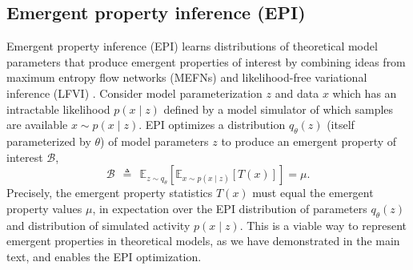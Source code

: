 \documentclass[11pt]{article}
\begin{document}
\subsection{Emergent property inference (EPI)}\label{methods_EPI}
Emergent property inference (EPI) learns distributions of theoretical model parameters that produce emergent properties of interest by combining ideas from maximum entropy flow networks (MEFNs) \cite{loaiza2017maximum} and likelihood-free variational inference (LFVI) \cite{tran2017hierarchical}.  
Consider model parameterization $z$ and data $x$ which has an intractable likelihood $p(x \mid z)$ defined by a model simulator of which samples are available $x \sim p(x \mid z)$.  
EPI optimizes a distribution $q_\theta(z)$ (itself parameterized by $\theta$) of model parameters $z$ to produce an emergent property of interest $\mathcal{B}$,
\begin{equation}
\mathcal{B} ~~\triangleq~~  \mathbb{E}_{z \sim q_\theta}\left[ \mathbb{E}_{x\sim p(x \mid z)}\left[T(x)\right] \right] = \mu.
\end{equation}
Precisely, the emergent property statistics $T(x)$ must equal the emergent property values $\mu$, in expectation over the EPI distribution of parameters $q_\theta(z)$ and distribution of simulated activity $p(x \mid z)$.  This is a viable way to represent emergent properties in theoretical models, as we have demonstrated in the main text, and enables the EPI optimization.
\end{document}
